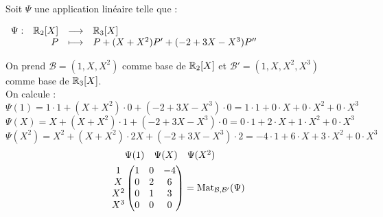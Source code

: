 \begin{example}
	Soit $\Psi$ une application linéaire telle que :
	\begin{center}
		$\begin{array}{rrcl} \Psi : & \mathbb{R}_2[X] & \longrightarrow & \mathbb{R}_3[X] \\ & P & \longmapsto & P + (X + X^2)P' + (-2 + 3X - X^3)P'' \end{array}$
	\end{center}
	On prend $\mathcal{B} = (1, X, X^2)$ comme base de $\mathbb{R}_2[X]$ et $\mathcal{B}' = (1, X, X^2, X^3)$ comme base de $\mathbb{R}_3[X]$.
	\\
	On calcule :
	\[ \Psi(1) = 1 \cdot 1 + (X + X^2) \cdot 0 + (-2 + 3X - X^3) \cdot 0 = 1 \cdot 1 + 0 \cdot X + 0 \cdot X^2 + 0 \cdot X^3 \]
	\[ \Psi(X) = X + (X + X^2) \cdot 1 + (-2 + 3X - X^3) \cdot 0 = 0 \cdot 1 + 2 \cdot X + 1 \cdot X^2 + 0 \cdot X^3 \]
	\[ \Psi(X^2) = X^2 + (X + X^2) \cdot 2X + (-2 + 3X - X^3) \cdot 2 = -4 \cdot 1 + 6 \cdot X + 3 \cdot X^2 + 0 \cdot X^3 \]
	\begin{align*}
		&\begin{matrix}
			\Psi(1) & \Psi(X) & \Psi(X^2)
		\end{matrix}
		\\
		\begin{matrix}
			1 \\
			X \\
			X^2 \\
			X^3
		\end{matrix}
		&
		\begin{pmatrix}
			1 & 0 & -4 \\
			0 & 2 & 6 \\
			0 & 1 & 3 \\
			0 & 0 & 0
		\end{pmatrix}
		= \operatorname{Mat}_{\mathcal{B}, \mathcal{B'}}(\Psi)
	\end{align*}
\end{example}

